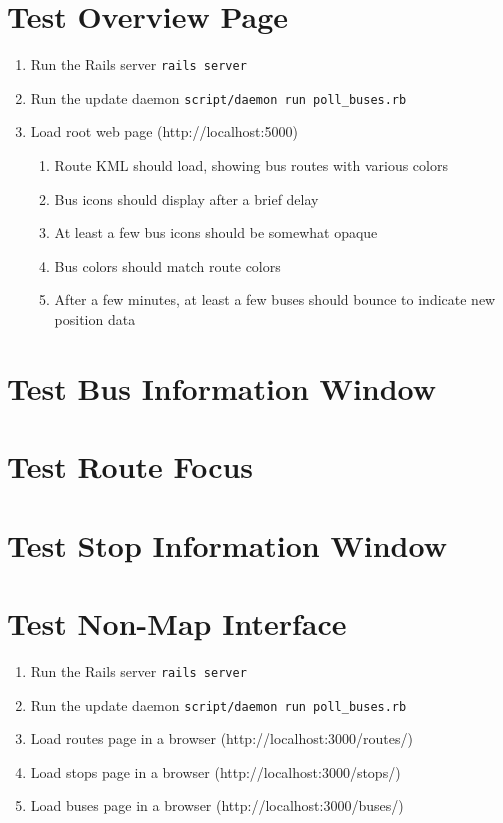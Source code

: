 \documentclass[12pt]{report}
\newcommand{\lstBash}{\lstinline[language=bash,breaklines=true]}
\begin{document}
\section{Test Overview Page}
\begin{enumerate}
\item Run the Rails server \lstBash|rails server|
\item Run the update daemon \lstBash|script/daemon run poll_buses.rb|
\item Load root web page (http://localhost:5000)
\begin{enumerate}
\item Route KML should load, showing bus routes with various colors
\item Bus icons should display after a brief delay
\item At least a few bus icons should be somewhat opaque
\item Bus colors should match route colors
\item After a few minutes, at least a few buses should bounce to indicate new position data
\end{enumerate}
\end{enumerate}

\section{Test Bus Information Window}

\section{Test Route Focus}

\section{Test Stop Information Window}

\section{Test Non-Map Interface}
\begin{enumerate}
\item Run the Rails server \lstBash|rails server|
\item Run the update daemon \lstBash|script/daemon run poll_buses.rb|
\item Load routes page in a browser (http://localhost:3000/routes/)
\item Load stops page in a browser (http://localhost:3000/stops/)
\item Load buses page in a browser (http://localhost:3000/buses/)
\end{enumerate}
\end{document}
